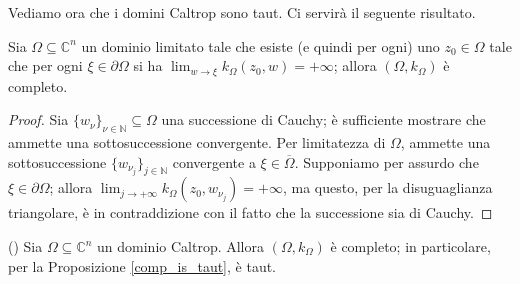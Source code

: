 Vediamo ora che i domini Caltrop sono taut. Ci servirà il seguente risultato.

\begin{lm} \label{ainftyecompl}
    Sia $\Omega\subseteq\mathbb{C}^n$ un dominio limitato tale che esiste (e quindi per ogni) uno $z_0\in\Omega$ tale che per ogni $\xi\in\partial\Omega$ si ha $\displaystyle\lim_{w\longrightarrow\xi}k_\Omega(z_0,w)=+\infty$; allora $(\Omega,k_\Omega)$ è completo.
\end{lm}

\begin{proof}
    Sia $\{w_\nu\}_{\nu\in\mathbb{N}}\subseteq\Omega$ una successione di Cauchy; è sufficiente mostrare che ammette una sottosuccessione convergente. Per limitatezza di $\Omega$, ammette una sottosuccessione $\{w_{\nu_j}\}_{j\in\mathbb{N}}$ convergente a $\xi\in\overline{\Omega}$. Supponiamo per assurdo che $\xi\in\partial\Omega$; allora $\displaystyle\lim_{j\longrightarrow+\infty}k_\Omega(z_0,w_{\nu_j})=+\infty$, ma questo, per la disuguaglianza triangolare, è in contraddizione con il fatto che la successione sia di Cauchy.
\end{proof}

\begin{thm}
    (\cite[Theorem 8.2]{BM}) Sia $\Omega\subseteq\mathbb{C}^n$ un dominio Caltrop. Allora $(\Omega,k_\Omega)$ è completo; in particolare, per la Proposizione \ref{comp_is_taut}, è taut.
\end{thm}

